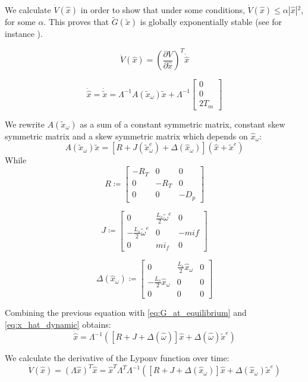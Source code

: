 \documentclass[letterpaper, 10 pt, conference]{ieeeconf}  %
\begin{document}
We calculate $\dot{V}(\hat{x})$ in order to show that under some
conditions, $\dot{V}(\hat{x})\leq\alpha|\hat{x}|{}^{2}$, for some
$\alpha.$ This  proves that $\tilde{G}(\tilde{x})$ is globally
exponentially stable (see for instance \cite{Sastry}).

$$
\dot{V}(\hat{x})=\left(\frac{\partial V}{\partial\hat{x}}\right)^{T}\dot{\hat{x}}
$$

\begin{equation}
\dot{\hat{x}}=\dot{\tilde{x}}=\varLambda^{-1}A(\tilde{x}_\omega)\tilde{x}+\varLambda^{-1}\left[\begin{array}{c}
0\\
0\\
2T_{m}
\end{array}\right]\label{eq:x_hat_dynamic}
\end{equation}

We rewrite  $A(\tilde{x}_{\omega})$ as a sum of a constant symmetric
matrix, constant skew symmetric matrix and a skew symmetric matrix
which depends on $\hat{x}_{\omega}$:
$$ 
A(\tilde{x}_{\omega})\tilde{x}=\left[R+J(\tilde{x}_{\omega}^{e})+\Delta(\hat{x}_{\omega})\right](\hat{x}+\tilde{x}^{e})
$$
While
$$
R\coloneqq\left[\begin{array}{ccc}
-R_T & 0 & 0\\
0 & -R_T & 0\\
0 & 0 & -D_{p}
\end{array}\right]
$$

$$
J\coloneqq\left[\begin{array}{ccc}
0 & \frac{L_{s}}{2}\tilde{\omega}^{e} & 0\\
-\frac{L_{s}}{2}\tilde{\omega}^{e} & 0 & -mif\\
0 & mi_{f} & 0
\end{array}\right]
$$

$$
\Delta(\hat{x}_{\omega})\coloneqq\left[\begin{array}{ccc}
0 & \frac{L_{s}}{2}\hat{x}_{\omega} & 0\\
-\frac{L_{s}}{2}\hat{x}_{\omega} & 0 & 0\\
0 & 0 & 0
\end{array}\right]
$$



Combining the previous equation with \eqref{eq:G_at_equilibrium} and \eqref{eq:x_hat_dynamic}
obtains: 
$$
\dot{\hat{x}}=\Lambda^{-1}\left( \left[R+J+\Delta(\hat{\omega})\right]\hat{x}+\Delta(\hat{\omega})\tilde{x}^{e}\right) 
$$

We calculate the derivative of the Lyponv function over  time: 
$$
\dot{V}(\hat{x})=\left(\Lambda\hat{x}\right)^{T}\dot{\hat{x}}=\hat{x}^{T}\Lambda^{T}\Lambda^{-1}\left( \left[R+J+\Delta(\hat{x}_{\omega})\right]\hat{x}+\Delta(\hat{x}_{\omega})\tilde{x}^{e}\right)
$$
\end{document}
